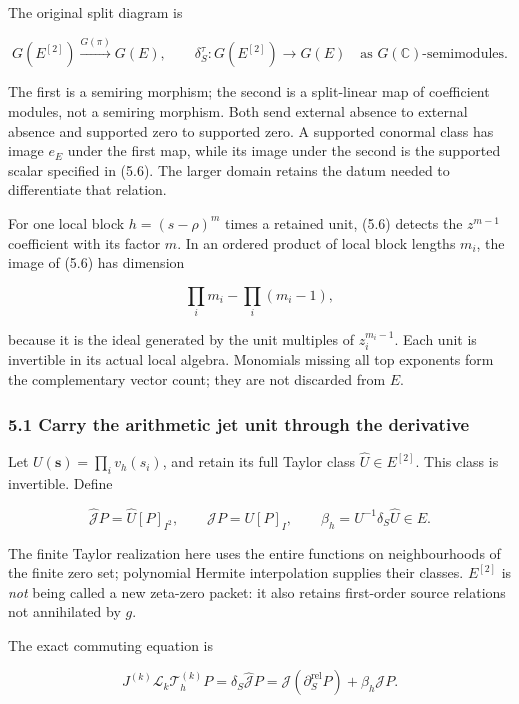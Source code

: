\documentclass[
]{article}
\begin{document}
The original split diagram is

\[G(E^{[2]})\xrightarrow{G(\pi)}G(E),\qquad
\delta_S^\tau:G(E^{[2]})\longrightarrow G(E)\quad\text{as }G(\mathbb C)\text{-semimodules}.\tag{5.8}\]

The first is a semiring morphism; the second is a split-linear map of
coefficient modules, not a semiring morphism. Both send external absence
to external absence and supported zero to supported zero. A supported
conormal class has image \(e_E\) under the first map, while its image
under the second is the supported scalar specified in (5.6). The larger
domain retains the datum needed to differentiate that relation.

For one local block \(h=(s-\rho)^m\) times a retained unit, (5.6)
detects the \(z^{m-1}\) coefficient with its factor \(m\). In an ordered
product of local block lengths \(m_i\), the image of (5.6) has dimension

\[\prod_i m_i-\prod_i(m_i-1),\tag{5.9}\]

because it is the ideal generated by the unit multiples of
\(z_i^{m_i-1}\). Each unit is invertible in its actual local algebra.
Monomials missing all top exponents form the complementary vector count;
they are not discarded from \(E\).

\subsubsection{5.1 Carry the arithmetic jet unit through the
derivative}\label{carry-the-arithmetic-jet-unit-through-the-derivative}

Let \(U(\mathbf s)=\prod_i v_h(s_i)\), and retain its full Taylor class
\(\widehat U\in E^{[2]}\). This class is invertible. Define

\[\widehat{\mathcal J}P=\widehat U[P]_{I^2},\qquad \mathcal JP=U[P]_I,\qquad \beta_h=U^{-1}\delta_S\widehat U\in E.\tag{5.10}\]

The finite Taylor realization here uses the entire functions on
neighbourhoods of the finite zero set; polynomial Hermite interpolation
supplies their classes. \(E^{[2]}\) is \emph{not} being called a new
zeta-zero packet: it also retains first-order source relations not
annihilated by \(g\).

The exact commuting equation is

\[\boxed{J^{(k)}\mathscr L_k\mathcal T_h^{(k)}P
=\delta_S\widehat{\mathcal J}P
=\mathcal J(\partial_S^{\mathrm{rel}}P)+\beta_h\mathcal JP.}\tag{5.11}\]
\end{document}
